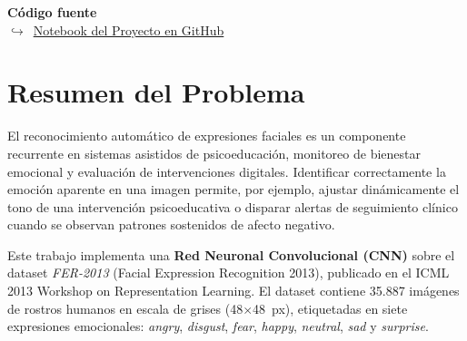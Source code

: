 \documentclass[10pt,a4paper,twocolumn]{article}
\newcommand{\githuburl}{https://github.com/jorgeqz/UIDE-Apredizaje-Profundo/blob/main/semana-2/CNN\_FER2013\_Grupo5.ipynb}
\begin{document}

\begin{codigofuente}
\textbf{Código fuente}\\[2pt]
$\hookrightarrow$~\href{\githuburl}{Notebook del Proyecto en GitHub}
\end{codigofuente}

\section{Resumen del Problema}

El reconocimiento automático de expresiones faciales es un componente recurrente en sistemas asistidos de psicoeducación, monitoreo de bienestar emocional y evaluación de intervenciones digitales. Identificar correctamente la emoción aparente en una imagen permite, por ejemplo, ajustar dinámicamente el tono de una intervención psicoeducativa o disparar alertas de seguimiento clínico cuando se observan patrones sostenidos de afecto negativo.

Este trabajo implementa una \textbf{Red Neuronal Convolucional (CNN)} sobre el dataset \textit{FER-2013} (Facial Expression Recognition 2013), publicado en el ICML 2013 Workshop on Representation Learning. El dataset contiene 35.887 imágenes de rostros humanos en escala de grises (48$\times$48~px), etiquetadas en siete expresiones emocionales: \textit{angry}, \textit{disgust}, \textit{fear}, \textit{happy}, \textit{neutral}, \textit{sad} y \textit{surprise}.
\end{document}
